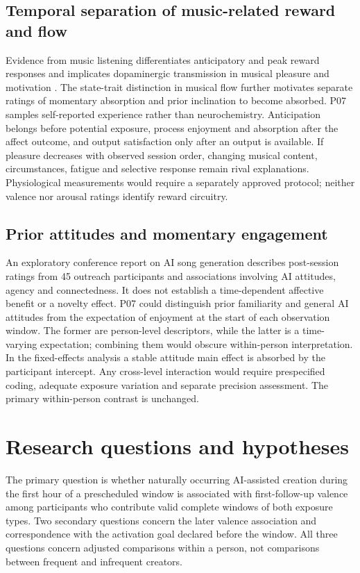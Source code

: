 \documentclass[11pt]{article}
\begin{document}
\subsection{Temporal separation of music-related reward and flow}
Evidence from music listening differentiates anticipatory and peak reward responses \citep{salimpoor2011} and implicates dopaminergic transmission in musical pleasure and motivation \citep{ferreri2019}. The state-trait distinction in musical flow \citep{chirico2015} further motivates separate ratings of momentary absorption and prior inclination to become absorbed. P07 samples self-reported experience rather than neurochemistry. Anticipation belongs before potential exposure, process enjoyment and absorption after the affect outcome, and output satisfaction only after an output is available. If pleasure decreases with observed session order, changing musical content, circumstances, fatigue and selective response remain rival explanations. Physiological measurements would require a separately approved protocol; neither valence nor arousal ratings identify reward circuitry.

\subsection{Prior attitudes and momentary engagement}
An exploratory conference report on AI song generation \citep{swarbrick2026} describes post-session ratings from 45 outreach participants and associations involving AI attitudes, agency and connectedness. It does not establish a time-dependent affective benefit or a novelty effect. P07 could distinguish prior familiarity and general AI attitudes from the expectation of enjoyment at the start of each observation window. The former are person-level descriptors, while the latter is a time-varying expectation; combining them would obscure within-person interpretation. In the fixed-effects analysis a stable attitude main effect is absorbed by the participant intercept. Any cross-level interaction would require prespecified coding, adequate exposure variation and separate precision assessment. The primary within-person contrast is unchanged.

\section{Research questions and hypotheses}
The primary question is whether naturally occurring AI-assisted creation during the first hour of a prescheduled window is associated with first-follow-up valence among participants who contribute valid complete windows of both exposure types. Two secondary questions concern the later valence association and correspondence with the activation goal declared before the window. All three questions concern adjusted comparisons within a person, not comparisons between frequent and infrequent creators.
\end{document}
